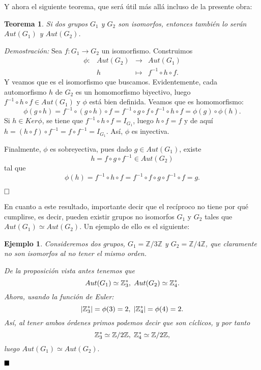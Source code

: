 \documentclass[12pt]{article}
\newtheorem{theorem}{Teorema}[section]
\newtheorem{example}{Ejemplo}[theorem]
\begin{document}
Y ahora el siguiente teorema, que será útil más allá incluso de la presente obra:

\begin{theorem} Si dos grupos $G_{1}$ y $G_{2}$ son isomorfos, entonces también lo serán $Aut(G_{1})$ y $Aut(G_{2})$. 
\end{theorem}
\emph{Demostración: }Sea $f\colon G_{1}\longrightarrow G_{2}$  un isomorfismo. Construimos $$\begin{array}{rccl}
\phi\colon &Aut(G_{2})& \longrightarrow &Aut(G_{1})\\
&h& \longmapsto &f^{-1} \circ h \circ f.
\end{array}
$$ Y veamos que es el isomorfismo que buscamos. Evidentemente, cada automorfismo $h$ de $G_{2}$ es un homomorfismo biyectivo, luego $f^{-1} \circ h \circ f \in Aut(G_{1})$ y $\phi$ está bien definida. Veamos que es homomorfismo: $$\phi(g \circ h) = f^{-1} \circ (g \circ h) \circ f = f^{-1} \circ g \circ f \circ f^{-1} \circ h \circ f = \phi(g) \circ \phi(h).$$ Si $h \in Ker \phi$, se tiene que $f^{-1} \circ h \circ f = I_{G_{1}}$, luego $h \circ f = f$ y de aquí $h = (h \circ f) \circ f^{-1} = f \circ f^{-1} = I_{G_{1}}$. Así, $\phi$ es inyectiva.

Finalmente, $\phi$ es sobreyectiva, pues dado $g \in Aut(G_{1})$, existe $$h = f \circ g \circ f^{-1} \in Aut(G_{2})$$ tal que $$\phi(h) = f^{-1} \circ h \circ f = f^{-1} \circ f \circ g \circ f^{-1} \circ f = g.$$

$\hfill \square$

En cuanto a este resultado, importante decir que el recíproco no tiene por qué cumplirse, es decir, pueden existir grupos no isomorfos $G_{1}$ y $G_{2}$ tales que $Aut(G_{1}) \simeq Aut(G_{2})$.	Un ejemplo de ello es el siguiente:

\begin{example} Consideremos dos grupos, $G_{1} = \mathbb{Z}/3\mathbb{Z}$ y $G_{2} = \mathbb{Z}/4\mathbb{Z}$, que claramente no son isomorfos al no tener el mismo orden.

De la proposición vista antes tenemos que $$Aut(G_{1}) \simeq \mathbb{Z}_{3}^{\ast}, \hspace{0.1cm} Aut(G_{2}) \simeq \mathbb{Z}_{4}^{\ast}.$$ Ahora, usando la función de Euler: $$|\mathbb{Z}_{3}^{\ast}| = \phi(3) = 2, \hspace{0.1cm} |\mathbb{Z}_{4}^{\ast}| = \phi(4) = 2.$$ Así, al tener ambos órdenes primos podemos decir que son cíclicos, y por tanto $$\mathbb{Z}_{3}^{\ast} \simeq \mathbb{Z}/2\mathbb{Z}, \hspace{0.1cm} \mathbb{Z}_{4}^{\ast} \simeq \mathbb{Z}/2\mathbb{Z},$$ luego $Aut(G_{1}) \simeq Aut(G_{2}).$
\end{example}
$\hfill \blacksquare$
\end{document}
